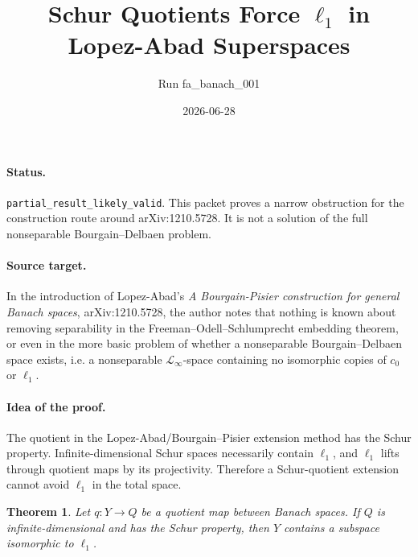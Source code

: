 \documentclass[11pt]{article}
\title{Schur Quotients Force \(\ell_1\) in Lopez-Abad Superspaces}
\author{Run fa\_banach\_001}
\date{2026-06-28}
\newtheorem*{theorem}{Theorem}
\newcommand{\linf}{\mathcal L_\infty}
\newcommand{\ellone}{\ell_1}
\newcommand{\czero}{c_0}
\begin{document}
\maketitle

\paragraph{Status.}
\texttt{partial\_result\_likely\_valid}.  This packet proves a narrow
obstruction for the construction route around arXiv:1210.5728.  It is not a
solution of the full nonseparable Bourgain--Delbaen problem.

\paragraph{Source target.}
In the introduction of Lopez-Abad's \emph{A Bourgain-Pisier construction for
general Banach spaces}, arXiv:1210.5728, the author notes that nothing is known
about removing separability in the Freeman--Odell--Schlumprecht embedding
theorem, or even in the more basic problem of whether a nonseparable
Bourgain--Delbaen space exists, i.e. a nonseparable \(\linf\)-space containing
no isomorphic copies of \(\czero\) or \(\ellone\).

\paragraph{Idea of the proof.}
The quotient in the Lopez-Abad/Bourgain--Pisier extension method has the Schur
property.  Infinite-dimensional Schur spaces necessarily contain \(\ellone\),
and \(\ellone\) lifts through quotient maps by its projectivity.  Therefore a
Schur-quotient extension cannot avoid \(\ellone\) in the total space.

\begin{theorem}
Let \(q:Y\to Q\) be a quotient map between Banach spaces.  If \(Q\) is
infinite-dimensional and has the Schur property, then \(Y\) contains a subspace
isomorphic to \(\ellone\).
\end{theorem}
\end{document}
